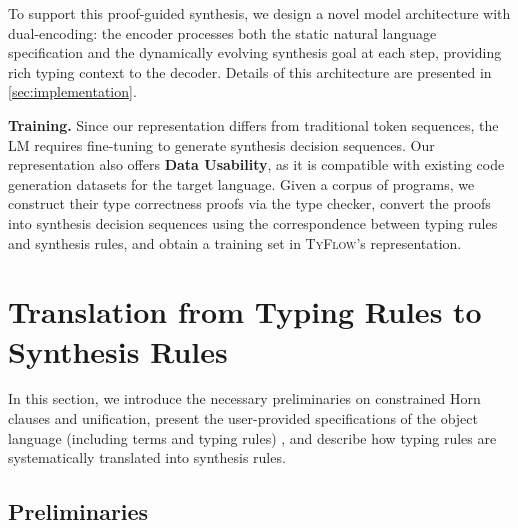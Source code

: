 \documentclass[manuscript,screen]{acmart}
\newcommand{\toolname}[1]{\textsc{#1}}
\newcommand{\mainname}{\toolname{TyFlow}\xspace}
\begin{document}
To support this proof-guided synthesis, we design a novel model architecture with dual-encoding: the encoder processes both the static natural language specification and the dynamically evolving synthesis goal at each step, providing rich typing context to the decoder. Details of this architecture are presented in \autoref{sec:implementation}.

\smallskip \noindent \textbf{Training.} Since our representation differs from traditional token sequences, the LM requires fine-tuning to generate synthesis decision sequences.
%
Our representation also offers \textbf{Data Usability}, as it is compatible with existing code generation datasets for the target language.
Given a corpus of programs, we construct their type correctness proofs via the type checker, convert the proofs into synthesis decision sequences using the correspondence between typing rules and synthesis rules, and obtain a training set in \mainname's representation. 


\section{Translation from Typing Rules to Synthesis Rules \label{sec:meta}}

In this section, we introduce the necessary preliminaries on constrained Horn clauses and unification,    {\color{revblue}present } the user-provided specifications of the object language    {\color{revblue}(including terms and typing rules)} , and describe how typing rules are systematically translated into synthesis rules.

\subsection{Preliminaries}
\end{document}
